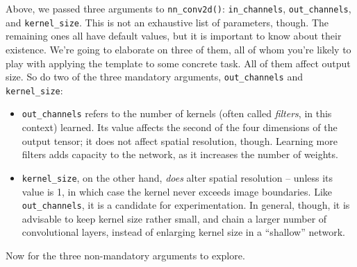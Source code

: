 \documentclass[
  letterpaper,
]{krantz}
\begin{document}
Above, we passed three arguments to \texttt{nn\_conv2d()}:
\texttt{in\_channels}, \texttt{out\_channels}, and
\texttt{kernel\_size}. This is not an exhaustive list of parameters,
though. The remaining ones all have default values, but it is important
to know about their existence. We're going to elaborate on three of
them, all of whom you're likely to play with applying the template to
some concrete task. All of them affect output size. So do two of the
three mandatory arguments, \texttt{out\_channels} and
\texttt{kernel\_size}:

\begin{itemize}
\item
  \texttt{out\_channels} refers to the number of kernels
  (often called \emph{filters}, in this context) learned.
  Its value affects the second of the four dimensions of the output
  tensor; it does not affect spatial resolution, though. Learning more
  filters adds capacity to the network, as it increases the number of
  weights.
\item
  \texttt{kernel\_size}, on the other hand, \emph{does} alter spatial
  resolution -- unless its value is 1, in which case the kernel never
  exceeds image boundaries. Like \texttt{out\_channels}, it is a
  candidate for experimentation. In general, though, it is advisable to
  keep kernel size rather small, and chain a larger number of
  convolutional layers, instead of enlarging kernel size in a
  ``shallow'' network.
\end{itemize}

Now for the three non-mandatory arguments to explore.
\end{document}
